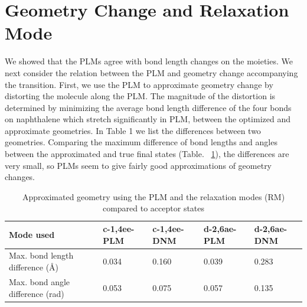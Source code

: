 \section{Geometry Change and Relaxation Mode}

We showed that the PLMs agree with bond length changes on the moieties.   We next
consider the relation between the PLM and geometry change accompanying the transition.
First, we use the PLM to approximate geometry change by distorting the molecule
along the PLM.   The magnitude of the distortion
 is determined  by minimizing the average bond length difference of the four bonds on naphthalene
 which stretch significantly in PLM, between the optimized and approximate geometries. In Table 1 we list the differences between two geometries.
Comparing the maximum difference of bond
lengths and angles between the approximated and true final states (Table. ~\ref{aprroxGeom}), the differences are very small,
so PLMs seem to give fairly good approximations of geometry changes.



\begin{table}[t]
 \caption{Approximated geometry using the PLM and the relaxation modes (RM) compared to acceptor states}
 \label{aprroxGeom}
 \begin{tabular}{lllll}
   \hline
   Mode used & c-1,4ee-PLM   & c-1,4ee-DNM  & d-2,6ae-PLM  & d-2,6ae-DNM\\
   \hline
   Max. bond length difference (\AA)   & 0.034 & 0.160 &0.039 & 0.283   \\
     Max. bond angle difference (rad)   & 0.053 &0.075 & 0.057 &0.135   \\
   \hline
 \end{tabular}
\end{table}



